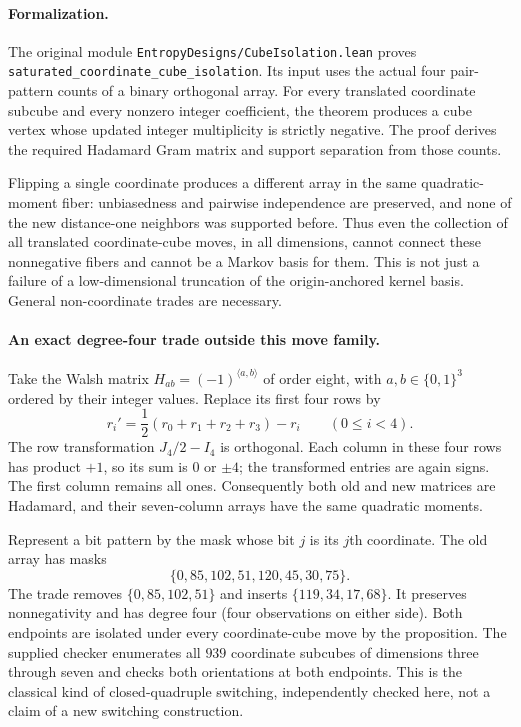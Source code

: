 \paragraph{Formalization.}
The original module \texttt{EntropyDesigns/\allowbreak CubeIsolation.lean}
proves \texttt{saturated\_\allowbreak coordinate\_\allowbreak cube\_\allowbreak isolation}.
Its input uses the actual four pair-pattern counts of a binary orthogonal
array. For every translated coordinate subcube and every nonzero integer
coefficient, the theorem produces a cube vertex whose updated integer
multiplicity is strictly negative. The proof derives the required
Hadamard Gram matrix and support separation from those counts.

Flipping a single coordinate produces a different array in the same
quadratic-moment fiber: unbiasedness and pairwise independence are
preserved, and none of the new distance-one neighbors was supported
before. Thus even the collection of all translated coordinate-cube moves,
in all dimensions, cannot connect these nonnegative fibers and cannot
be a Markov basis for them. This is not just a failure of a low-dimensional truncation of the
origin-anchored kernel basis. General non-coordinate trades are necessary.

\paragraph{An exact degree-four trade outside this move family.}
Take the Walsh matrix $H_{ab}=(-1)^{\langle a,b\rangle}$ of order eight,
with $a,b\in\{0,1\}^3$ ordered by their integer values. Replace its
first four rows by
\[
 r_i'=\frac12(r_0+r_1+r_2+r_3)-r_i\qquad(0\le i<4).
\]
The row transformation $J_4/2-I_4$ is orthogonal. Each column in these
four rows has product $+1$, so its sum is $0$ or $\pm4$; the transformed
entries are again signs. The first column remains all ones. Consequently
both old and new matrices are Hadamard, and their seven-column arrays
have the same quadratic moments.

Represent a bit pattern by the mask whose bit $j$ is its $j$th coordinate.
The old array has masks
\[
 \{0,85,102,51,120,45,30,75\}.
\]
The trade removes $\{0,85,102,51\}$ and inserts
$\{119,34,17,68\}$. It preserves nonnegativity and has degree four
(four observations on either side). Both endpoints are isolated under
every coordinate-cube move by the proposition. The supplied checker
enumerates all $939$ coordinate subcubes of dimensions three through
seven and checks both orientations at both endpoints. This is the
classical kind of closed-quadruple switching, independently checked here,
not a claim of a new switching construction.


